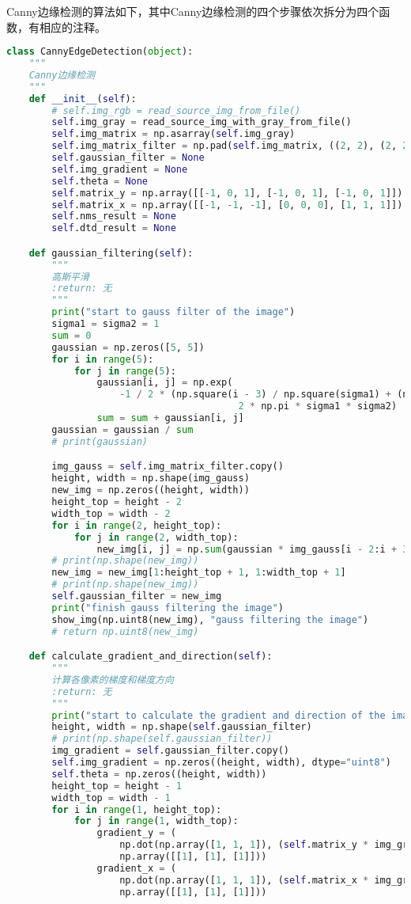 \documentclass{hitreport}
\begin{document}
Canny边缘检测的算法如下，其中Canny边缘检测的四个步骤依次拆分为四个函数，有相应的注释。
\begin{lstlisting}[language=python]
class CannyEdgeDetection(object):
    """
    Canny边缘检测
    """
    def __init__(self):
        # self.img_rgb = read_source_img_from_file()
        self.img_gray = read_source_img_with_gray_from_file()
        self.img_matrix = np.asarray(self.img_gray)
        self.img_matrix_filter = np.pad(self.img_matrix, ((2, 2), (2, 2)), 'constant', constant_values=(0, 0))
        self.gaussian_filter = None
        self.img_gradient = None
        self.theta = None
        self.matrix_y = np.array([[-1, 0, 1], [-1, 0, 1], [-1, 0, 1]])
        self.matrix_x = np.array([[-1, -1, -1], [0, 0, 0], [1, 1, 1]])
        self.nms_result = None
        self.dtd_result = None

    def gaussian_filtering(self):
        """
        高斯平滑
        :return: 无
        """
        print("start to gauss filter of the image")
        sigma1 = sigma2 = 1
        sum = 0
        gaussian = np.zeros([5, 5])
        for i in range(5):
            for j in range(5):
                gaussian[i, j] = np.exp(
                    -1 / 2 * (np.square(i - 3) / np.square(sigma1) + (np.square(j - 3) / np.square(sigma2)))) / (
                                         2 * np.pi * sigma1 * sigma2)
                sum = sum + gaussian[i, j]
        gaussian = gaussian / sum
        # print(gaussian)

        img_gauss = self.img_matrix_filter.copy()
        height, width = np.shape(img_gauss)
        new_img = np.zeros((height, width))
        height_top = height - 2
        width_top = width - 2
        for i in range(2, height_top):
            for j in range(2, width_top):
                new_img[i, j] = np.sum(gaussian * img_gauss[i - 2:i + 3, j - 2:j + 3])
        # print(np.shape(new_img))
        new_img = new_img[1:height_top + 1, 1:width_top + 1]
        # print(np.shape(new_img))
        self.gaussian_filter = new_img
        print("finish gauss filtering the image")
        show_img(np.uint8(new_img), "gauss filtering the image")
        # return np.uint8(new_img)

    def calculate_gradient_and_direction(self):
        """
        计算各像素的梯度和梯度方向
        :return: 无
        """
        print("start to calculate the gradient and direction of the image")
        height, width = np.shape(self.gaussian_filter)
        # print(np.shape(self.gaussian_filter))
        img_gradient = self.gaussian_filter.copy()
        self.img_gradient = np.zeros((height, width), dtype="uint8")
        self.theta = np.zeros((height, width))
        height_top = height - 1
        width_top = width - 1
        for i in range(1, height_top):
            for j in range(1, width_top):
                gradient_y = (
                    np.dot(np.array([1, 1, 1]), (self.matrix_y * img_gradient[i - 1:i + 2, j - 1:j + 2]))).dot(
                    np.array([[1], [1], [1]]))
                gradient_x = (
                    np.dot(np.array([1, 1, 1]), (self.matrix_x * img_gradient[i - 1:i + 2, j - 1:j + 2]))).dot(
                    np.array([[1], [1], [1]]))


\end{lstlisting}
\end{document}
